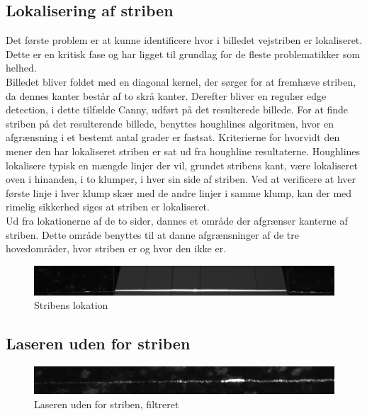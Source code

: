 \subsection{Lokalisering af striben\label{ref::stribefind}}
Det første problem er at kunne identificere hvor i billedet vejstriben er lokaliseret. Dette er en kritisk fase og har ligget til grundlag for de fleste problematikker som helhed.
\\
Billedet bliver foldet med en diagonal kernel, der sørger for at fremhæve striben, da dennes kanter består af to skrå kanter.
Derefter bliver en regulær edge detection, i dette tilfælde Canny, udført på det resulterede billede. For at finde striben på det resulterende billede, benyttes houghlines algoritmen, hvor en afgrænsning i et bestemt antal grader er fastsat. Kriterierne for hvorvidt den mener den har lokaliseret striben er sat ud fra houghline resultaterne. Houghlines lokalisere typisk en mængde linjer der vil, grundet stribens kant, være lokaliseret oven i hinanden, i to klumper, i hver sin side af striben.
Ved at verificere at hver første linje i hver klump skær med de andre linjer i samme klump, kan der med rimelig sikkerhed siges at striben er lokaliseret.
\\
Ud fra lokationerne af de to sider, dannes et område der afgrænser kanterne af striben. Dette område benyttes til at danne afgrænsninger af de tre hovedområder, hvor striben er og hvor den ikke er.

\begin{figure}[h]
	\centering
	\includegraphics[width=0.8\linewidth]{Billeder/_1_normal}
	\caption{Stribens lokation}
	\label{fig:1normal}
\end{figure}

\newpage

\subsection{Laseren uden for striben}

\begin{figure}[h]
	\centering
	\includegraphics[width=0.7\linewidth]{Billeder/base_1_filter}
	\caption{Laseren uden for striben, filtreret}
	\label{fig:base_1_filter}
\end{figure}

